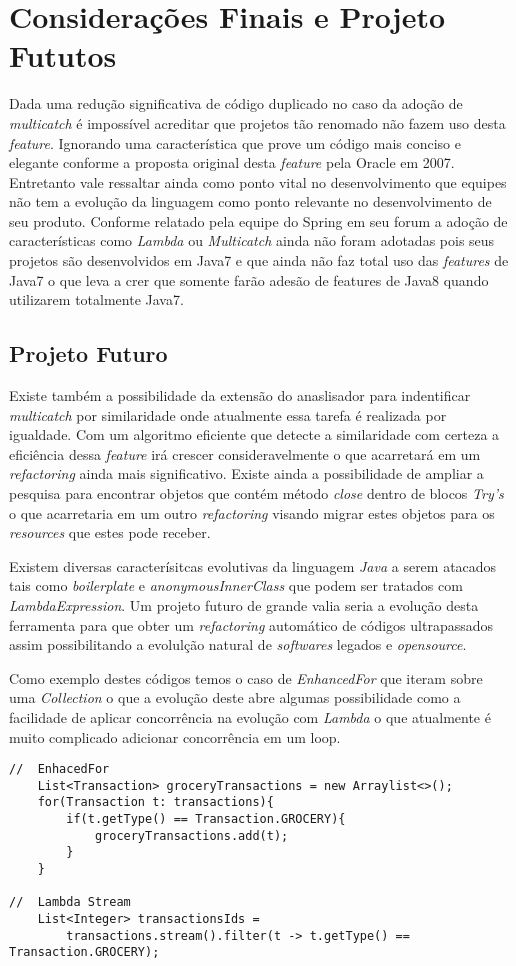 \chapter{Considerações Finais e Projeto Fututos}
Dada uma redução significativa de código duplicado no caso da adoção de \textit{multicatch} é impossível acreditar que projetos tão renomado não fazem uso desta \textit{feature}. Ignorando uma característica que prove um código mais conciso e elegante conforme a proposta original desta \textit{feature} pela Oracle em 2007. Entretanto vale ressaltar ainda como ponto vital no desenvolvimento que equipes não tem a evolução da linguagem como ponto relevante no desenvolvimento de seu produto. 
Conforme relatado pela equipe do Spring em seu forum a adoção de características como \textit{Lambda} ou \textit{Multicatch} ainda não foram adotadas pois seus projetos são desenvolvidos em Java7 e que ainda não faz total uso das \textit{features} de Java7 o que leva a crer que somente farão adesão de features de Java8 quando utilizarem totalmente Java7.

\section{Projeto Futuro}
Existe também a possibilidade da extensão do anaslisador para indentificar \textit{multicatch} por similaridade onde atualmente essa tarefa é realizada por igualdade. Com um algoritmo eficiente que detecte a similaridade com certeza a eficiência dessa \textit{feature} irá crescer consideravelmente o que acarretará em um \textit{refactoring} ainda mais significativo. Existe ainda a possibilidade de ampliar a pesquisa para encontrar objetos que contém método \textit{close} dentro de blocos \textit{Try's} o que acarretaria em um outro \textit{refactoring} visando migrar estes objetos para os \textit{resources} que estes pode receber.

Existem diversas caracterísitcas evolutivas da linguagem \textit{Java} a serem atacados tais como \textit{boilerplate} e \textit{anonymousInnerClass} que podem ser tratados com \textit{LambdaExpression}. Um projeto futuro de grande valia seria a evolução desta ferramenta para que obter um \textit{refactoring} automático de códigos ultrapassados assim possibilitando a evolulção natural de \textit{softwares} legados e \textit{opensource}.

Como exemplo destes códigos temos o caso de \textit{EnhancedFor} que iteram sobre uma \textit{Collection} o que a evolução deste abre algumas possibilidade como a facilidade de aplicar concorrência na evolução com \textit{Lambda} o que atualmente é muito complicado adicionar concorrência em um loop.

\begin{lstlisting}
//	EnhacedFor
	List<Transaction> groceryTransactions = new Arraylist<>();
	for(Transaction t: transactions){
		if(t.getType() == Transaction.GROCERY){
			groceryTransactions.add(t);
		}
	}

//	Lambda Stream
	List<Integer> transactionsIds = 
		transactions.stream().filter(t -> t.getType() == Transaction.GROCERY);
\end{lstlisting}